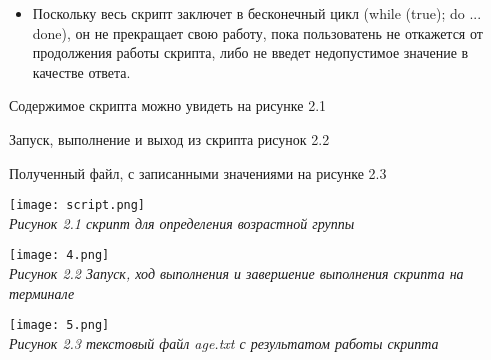 \begin{itemize}
	\item
	Поскольку весь скрипт заключет в бесконечный цикл (while (true); do ... done), он не прекращает свою работу, пока пользоватень не откажется от продолжения работы скрипта, либо не введет недопустимое значение в качестве ответа.\\
	\end{itemize}
	
\vspace{2cm}

Содержимое скрипта можно увидеть на рисунке 2.1\\

\vspace{1cm}

Запуск, выполнение и выход из скрипта рисунок 2.2\\

\vspace{1cm}

Полученный файл, с записанными значениями на рисунке 2.3\\

\vspace{1cm}
	
\begin{center}
	\texttt{[image: script.png]}
	\\
	\textit{Рисунок 2.1 скрипт для определения возрастной группы}	
	\\
\end{center}
	
\begin{center}
	\texttt{[image: 4.png]}
	\\
	\textit{Рисунок 2.2 Запуск, ход выполнения и завершение выполнения скрипта на терминале}
	\\	
\end{center}
	
\begin{center}
	\texttt{[image: 5.png]}
	\\
	\textit{Рисунок 2.3 текстовый файл age.txt с результатом работы скрипта}
	\\	
\end{center}
	

	
	